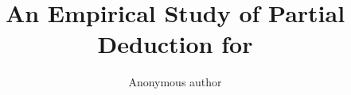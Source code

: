 \documentclass[runningheads]{llncs}
\begin{document}
\title{An Empirical Study of Partial Deduction for \mk}

%
%
\author{Anonymous author}
%
%


\maketitle












\end{document}
